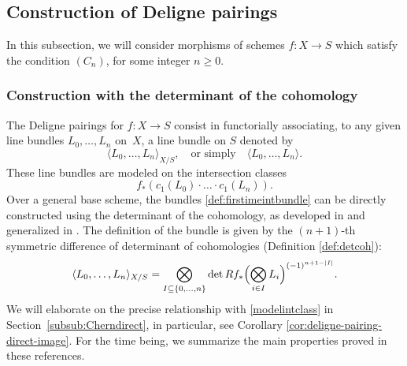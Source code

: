 \subsection{Construction of Deligne pairings}\label{subsec:Deligne-pairings} In this subsection, we will consider morphisms of schemes $f\colon X \to S$ which satisfy the condition $(C_n)$, for some integer $n\geq 0$.

\subsubsection{Construction with the determinant of the cohomology}

The Deligne pairings for $f\colon X\to S$ consist in functorially associating, to any given line bundles $L_{0},\ldots, L_{n}$ on~$X$, a line bundle on $S$ denoted by
\begin{equation} \label{def:firstimeintbundle}
\langle L_0, \ldots, L_n \rangle_{X/S},\quad\text{or simply}\quad\langle L_0, \ldots, L_n \rangle.
\end{equation}
These line bundles are modeled on the intersection classes
\begin{equation}\label{modelintclass}
f_\ast (c_1(L_0)\cdot \ldots\cdot c_1(L_n) ).
\end{equation}
Over a general base scheme, the bundles \eqref{def:firstimeintbundle} can be directly constructed using the determinant of the cohomology, as developed in \cite{Ducrot} and generalized in \cite[App.]{Boucksom-Eriksson}. The definition of the bundle is given by the $(n+1)$-th symmetric difference of determinant of cohomologies (\cf Definition \ref{def:detcoh}):
\begin{equation}\label{eq:definition-ducrot}
\langle L_0, \ldots, L_n \rangle_{X/S} = \bigotimes_{I \subseteq \{0, \ldots, n \}} \det Rf_* \Bigl( \bigotimes_{i \in I} L_i \Bigr)^{(-1)^{n+1-|I|}}.
\end{equation}
We will elaborate on the precise relationship with \eqref{modelintclass} in Section~\ref{subsub:Cherndirect}, in particular, see Corollary \ref{cor:deligne-pairing-direct-image}. For the time being, we summarize the main properties proved in these references.

